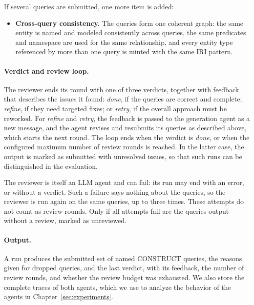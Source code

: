 If several queries are submitted, one more item is added:
\begin{itemize}[leftmargin=*, itemsep=3pt]
  \item \textbf{Cross-query consistency.} The queries form one coherent graph: the same entity is named and modeled consistently across queries, the same predicates and namespace are used for the same relationship, and every entity type referenced by more than one query is minted with the same IRI pattern.
\end{itemize}

\paragraph{Verdict and review loop.}
The reviewer ends its round with one of three verdicts, together with feedback that describes the issues it found: \emph{done}, if the queries are correct and complete; \emph{refine}, if they need targeted fixes; or \emph{retry}, if the overall approach must be reworked. For \emph{refine} and \emph{retry}, the feedback is passed to the generation agent as a new message, and the agent revises and resubmits its queries as described above, which starts the next round. The loop ends when the verdict is \emph{done}, or when the configured maximum number of review rounds is reached. In the latter case, the output is marked as submitted with unresolved issues, so that such runs can be distinguished in the evaluation.

The reviewer is itself an LLM agent and can fail: its run may end with an error, or without a verdict. Such a failure says nothing about the queries, so the reviewer is run again on the same queries, up to three times. These attempts do not count as review rounds. Only if all attempts fail are the queries output without a review, marked as unreviewed.

\paragraph{Output.}
A run produces the submitted set of named CONSTRUCT queries, the reasons given for dropped queries, and the last verdict, with its feedback, the number of review rounds, and whether the review budget was exhausted. We also store the complete traces of both agents, which we use to analyze the behavior of the agents in Chapter~\ref{sec:experiments}.


